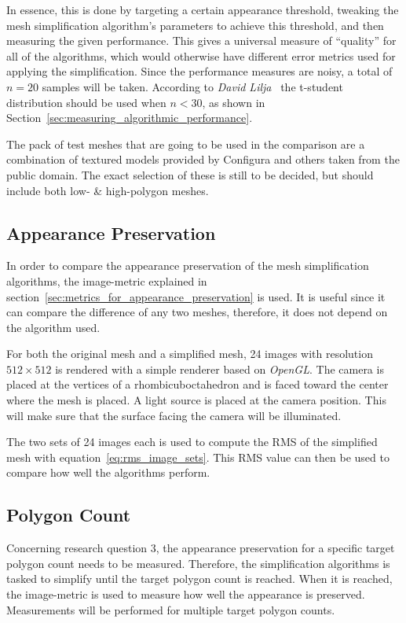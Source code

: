 In essence, this is done by targeting a certain appearance threshold, tweaking the mesh simplification algorithm's parameters to achieve this threshold, and then measuring the given performance. This gives a universal measure of ``quality'' for all of the algorithms, which would otherwise have different error metrics used for applying the simplification. Since the performance measures are noisy, a total of \(n=20\) samples will be taken. According to \emph{David Lilja}~\cite[p.~50]{lilja2005measuring} the t-student distribution should be used when \(n < 30\), as shown in Section~\ref{sec:measuring_algorithmic_performance}.

The pack of test meshes that are going to be used in the comparison are a combination of textured models provided by Configura and others taken from the public domain. The exact selection of these is still to be decided, but should include both low- \& high-polygon meshes.
\fi

\iffalse
\subsection{Appearance Preservation} \label{sec:appearance_preservation}
In order to compare the appearance preservation of the mesh simplification algorithms, the image-metric explained in section~\ref{sec:metrics_for_appearance_preservation} is used. It is useful since it can compare the difference of any two meshes, therefore, it does not depend on the algorithm used.

For both the original mesh and a simplified mesh, 24 images with resolution $512 \times 512$ is rendered with a simple renderer based on \emph{OpenGL}. The camera is placed at the vertices of a rhombicuboctahedron and is faced toward the center where the mesh is placed. A light source is placed at the camera position. This will make sure that the surface facing the camera will be illuminated.

The two sets of 24 images each is used to compute the RMS of the simplified mesh with equation~\ref{eq:rms_image_sets}. This RMS value can then be used to compare how well the algorithms perform. 
\subsection{Polygon Count} \label{sec:polygon_count}
Concerning research question 3, the appearance preservation for a specific target polygon count needs to be measured. Therefore, the simplification algorithms is tasked to simplify until the target polygon count is reached. When it is reached, the image-metric is used to measure how well the appearance is preserved. Measurements will be performed for multiple target polygon counts. 

